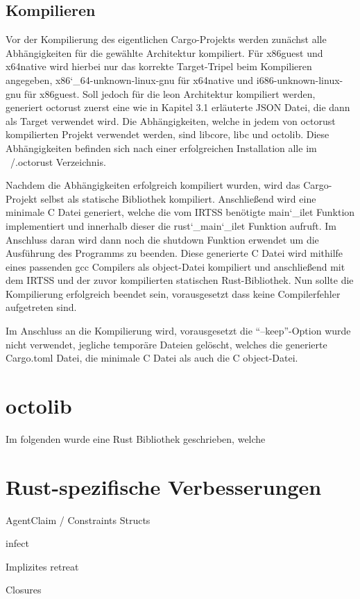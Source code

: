 \subsection{Kompilieren}

Vor der Kompilierung des eigentlichen Cargo-Projekts werden zunächst alle Abhängigkeiten für die gewählte Architektur kompiliert.
Für x86guest und x64native wird hierbei nur das korrekte Target-Tripel beim Kompilieren angegeben, x86\char`_64-unknown-linux-gnu für 
x64native und i686-unknown-linux-gnu für x86guest. Soll jedoch für die leon Architektur kompiliert werden, generiert octorust
zuerst eine wie in Kapitel 3.1 erläuterte JSON Datei, die dann als Target verwendet wird.
Die Abhängigkeiten, welche in jedem von octorust kompilierten Projekt verwendet werden, sind libcore, libc und octolib. Diese
Abhängigkeiten befinden sich nach einer erfolgreichen Installation alle im ~/.octorust Verzeichnis.

Nachdem die Abhängigkeiten erfolgreich kompiliert wurden, wird das Cargo-Projekt selbst als statische Bibliothek kompiliert.
Anschließend wird eine minimale C Datei generiert, welche die vom IRTSS benötigte main\char`_ilet Funktion implementiert und innerhalb
dieser die rust\char`_main\char`_ilet Funktion aufruft. Im Anschluss daran wird dann noch die shutdown Funktion erwendet um die 
Ausführung des Programms zu beenden. Diese generierte C Datei wird mithilfe eines passenden gcc Compilers als object-Datei kompiliert
und anschließend mit dem IRTSS und der zuvor kompilierten statischen Rust-Bibliothek. Nun sollte die Kompilierung erfolgreich beendet
sein, vorausgesetzt dass keine Compilerfehler aufgetreten sind.

Im Anschluss an die Kompilierung wird, vorausgesetzt die ``--keep''-Option wurde nicht verwendet, jegliche temporäre Dateien
gelöscht, welches die generierte Cargo.toml Datei, die minimale C Datei als auch die C object-Datei.

\section{octolib}

Im folgenden wurde eine Rust Bibliothek geschrieben, welche

\section{Rust-spezifische Verbesserungen}

AgentClaim / Constraints Structs

infect

Implizites retreat

Closures

